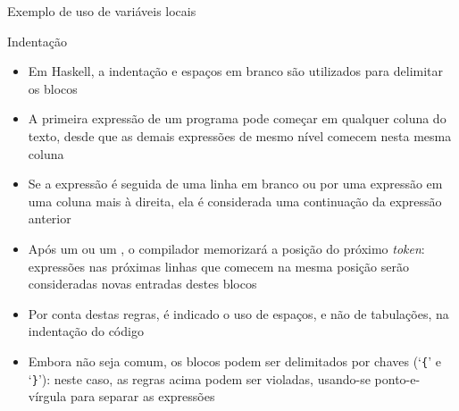 \begin{frame}[fragile]{Exemplo de uso de variáveis locais}
\end{frame}

\begin{frame}[fragile]{Indentação}

    \begin{itemize}
        \item Em Haskell, a indentação e espaços em branco são utilizados para delimitar os
            blocos

        \item A primeira expressão de um programa pode começar em qualquer coluna do texto, desde
            que as demais expressões de mesmo nível comecem nesta mesma coluna

        \item Se a expressão é seguida de uma linha em branco ou por uma expressão em uma coluna
            mais à direita, ela é considerada uma continuação da expressão anterior

        \item Após um  ou um , o compilador memorizará
            a posição do próximo \textit{token}: expressões nas próximas linhas que comecem na
            mesma posição serão consideradas novas entradas destes blocos

        \item Por conta destas regras, é indicado o uso de espaços, e não de tabulações, na
            indentação do código

        \item Embora não seja comum, os blocos podem ser delimitados por chaves (`\texttt{\{}' e
            `\texttt{\}}'): neste caso, as regras acima podem ser violadas, usando-se 
            ponto-e-vírgula para separar as expressões
            
    \end{itemize}

\end{frame}

